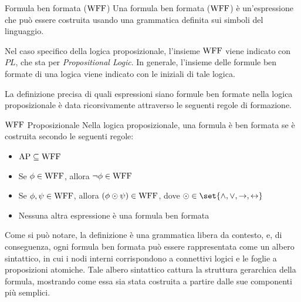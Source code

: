 \begin{definition}{Formula ben formata (\(\operatorname{WFF}\))}
  Una formula ben formata (\(\operatorname{WFF}\)) è un'espressione che può essere costruita usando una grammatica definita sui simboli del linguaggio.
\end{definition}

Nel caso specifico della logica proposizionale, l'insieme \(\operatorname{WFF}\) viene indicato con \(PL\), che sta per \textit{Propositional Logic}.
In generale, l'insieme delle formule ben formate di una logica viene indicato con le iniziali di tale logica. 

La definizione precisa di quali espressioni siano formule ben formate nella logica proposizionale è data ricorsivamente attraverso le seguenti regole di formazione.

\begin{definition}{\(\operatorname{WFF}\) Proposizionale}
  Nella logica proposizionale, una formula è ben formata se è costruita secondo le seguenti regole:
\begin{itemize}
  \item \(\AP \subseteq \WFF\)
  \item Se \(\phi \in \operatorname{WFF}\), allora \(\neg \phi \in \operatorname{WFF}\)
  \item Se \(\phi,\psi \in \operatorname{WFF}\), allora \((\phi \odot \psi)\in \operatorname{WFF}\), dove \(\odot \in \set{\land, \lor, \rightarrow, \leftrightarrow}\) 
  \item Nessuna altra espressione è una formula ben formata
\end{itemize}
  
\end{definition}

Come si può notare, la definizione è una grammatica libera da contesto, e, di conseguenza, ogni formula ben formata può essere rappresentata come un albero sintattico, in cui i nodi interni corrispondono a connettivi logici e le foglie a proposizioni atomiche.
Tale albero sintattico cattura la struttura gerarchica della formula, mostrando come essa sia stata costruita a partire dalle sue componenti più semplici.

